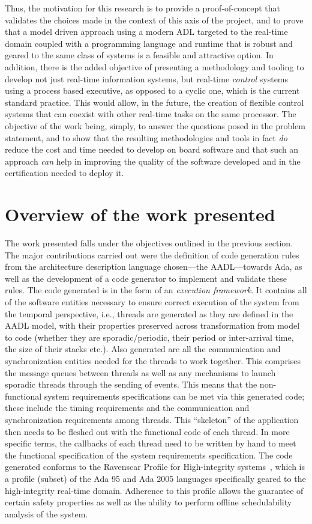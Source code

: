 Thus, the motivation for this research is to provide a
proof-of-concept that validates the choices made in the context of
this axis of the project, and to prove that a model driven approach
using a modern ADL targeted to the real-time domain coupled with a
programming language and runtime that is robust and geared to the same
class of systems is a feasible and attractive option. In addition,
there is the added objective of presenting a methodology and tooling
to develop not just real-time information systems, but real-time
\emph{control} systems using a process based executive, as opposed to
a cyclic one, which is the current standard practice. This would
allow, in the future, the creation of flexible control systems that
can coexist with other real-time tasks on the same processor. The
objective of the work being, simply, to answer the questions posed in
the problem statement, and to show that the resulting methodologies
and tools in fact \emph{do} reduce the cost and time needed to develop
on board software and that such an approach \emph{can} help in
improving the quality of the software developed and in the
certification needed to deploy it.

\section{Overview of the work presented}
The work presented falls under the objectives outlined in the previous
section. The major contributions carried out were the definition of
code generation rules from the architecture description language
chosen---the AADL---towards Ada, as well as the development of a code
generator to implement and validate these rules. The code generated is
in the form of an \emph{execution framework}. It contains all of the
software entities necessary to ensure correct execution of the system
from the temporal perspective, i.e., threads are generated as they are
defined in the AADL model, with their properties preserved across
transformation from model to code (whether they are sporadic/periodic,
their period or inter-arrival time, the size of their stacks
etc.). Also generated are all the communication and synchronization
entities needed for the threads to work together. This comprises the
message queues between threads as well as any mechanisms to launch
sporadic threads through the sending of events. This means that the
non-functional system requirements specifications can be met via this
generated code; these include the timing requirements and the
communication and synchronization requirements among threads. This
``skeleton'' of the application then needs to be fleshed out with the
functional code of each thread. In more specific terms, the callbacks
of each thread need to be written by hand to meet the functional
specification of the system requirements specification. The code
generated conforms to the Ravenscar Profile for High-integrity
systems~\cite{burns@adalett04}, which is a profile (subset) of the Ada
95 and Ada 2005 languages specifically geared to the high-integrity
real-time domain. Adherence to this profile allows the guarantee of
certain safety properties as well as the ability to perform offline
schedulability analysis of the system.

